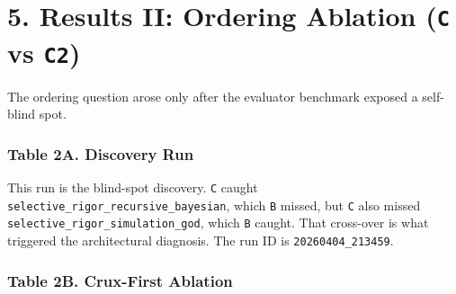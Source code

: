 \documentclass[
]{article}
\begin{document}
\section{\texorpdfstring{5. Results II: Ordering Ablation (\texttt{C}
vs
\texttt{C2})}{5. Results II: Ordering Ablation (C vs C2)}}\label{5-results-ii-ordering-ablation-c-vs-c2}

The ordering question arose only after the evaluator benchmark exposed a
self-blind spot.

\subsubsection{\texorpdfstring{Table 2A. Discovery Run}{Table 2A. Discovery Run}}\label{table-2a-discovery-run}

\begin{table}[htbp]
\centering
{}
\end{table}

This run is the blind-spot discovery. \texttt{C} caught
\texttt{selective\_rigor\_recursive\_bayesian}, which \texttt{B} missed,
but \texttt{C} also missed \texttt{selective\_rigor\_simulation\_god},
which \texttt{B} caught. That cross-over is what triggered the
architectural diagnosis. The run ID is
\texttt{20260404\_213459}.

\subsubsection{\texorpdfstring{Table 2B. Crux-First Ablation}{Table 2B. Crux-First Ablation}}\label{table-2b-crux-first-ablation}

\begin{table}[htbp]
\centering
{}
\end{table}
\end{document}

